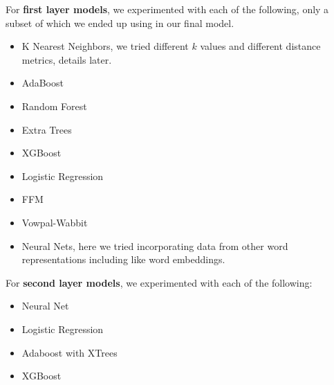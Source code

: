 \begin{itemize}
        For \textbf{first layer models}, we experimented with each of the following, only a subset of which we ended up using in our final model.
        \begin{itemize}
            \item K Nearest Neighbors, we tried different $k$ values and different distance metrics, details later.
            \item AdaBoost
            \item Random Forest
            \item Extra Trees
            \item XGBoost
            \item Logistic Regression
            \item FFM
            \item Vowpal-Wabbit
            \item Neural Nets, here we tried incorporating data from other word representations including like word embeddings.
        \end{itemize}

        For \textbf{second layer models}, we experimented with each of the following:
        \begin{itemize}
            \item Neural Net
            \item Logistic Regression
            \item Adaboost with XTrees
            \item XGBoost
        \end{itemize}


\end{itemize}
